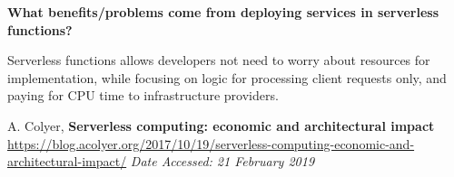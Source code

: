 \documentclass[12pt]{article}
\begin{document}
\pagestyle{empty}

{\bf What benefits/problems come from deploying services in serverless functions?}

Serverless functions allows developers not need to worry about resources 
for implementation, while focusing on logic for processing client requests only, 
and paying for CPU time to infrastructure providers. 

{\footnotesize
\begin{thebibliography}{9}
    A. Colyer, \textbf{Serverless computing: economic and architectural impact}
    \url{https://blog.acolyer.org/2017/10/19/serverless-computing-economic-and-architectural-impact/}
    \textit{Date Accessed: 21 February 2019}
    
\end{thebibliography}
}
\end{document}
